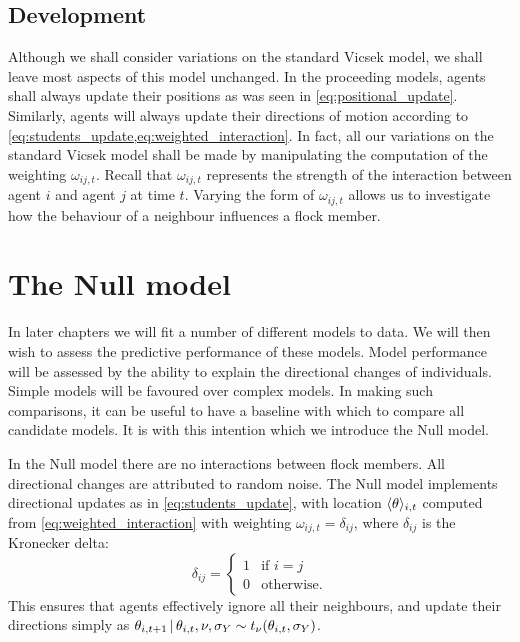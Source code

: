 \subsection{Development}

Although we shall consider variations on the standard Vicsek model, we shall
leave most aspects of this model unchanged. In the proceeding models, agents
shall always update their positions as was seen in \cref{eq:positional_update}.
Similarly, agents will always update their directions of motion according to
\cref{eq:students_update,eq:weighted_interaction}. In fact, all our variations
on the standard Vicsek model shall be made by manipulating the computation of
the weighting $\omega_{ij,t}$. Recall that $\omega_{ij,t}$ represents the
strength of the interaction between agent $i$ and agent $j$ at time $t$.
Varying the form of $\omega_{ij,t}$ allows us to investigate how the behaviour
of a neighbour influences a flock member.

\section{The Null model}
\label{sec:null_model}

In later chapters we will fit a number of different models to data. We will
then wish to assess the predictive performance of these models. Model
performance will be assessed by the ability to explain the directional changes
of individuals. Simple models will be favoured over complex models. In making
such comparisons, it can be useful to have a baseline with which to compare all
candidate models. It is with this intention which we introduce the Null model.

In the Null model there are no interactions between flock members. All
directional changes are attributed to random noise. The Null model implements
directional updates as in \cref{eq:students_update}, with location
$\langle\theta\rangle_{i,t}$ computed from \cref{eq:weighted_interaction} with
weighting $\omega_{ij,t}=\delta_{ij}$, where $\delta_{ij}$ is the Kronecker
delta:
\begin{equation*}
  \delta_{ij} =
  \begin{cases}
    1 & \text{if } i=j \\
    0 & \text{otherwise.}
  \end{cases}
\end{equation*}
This ensures that agents effectively ignore all their neighbours, and update
their directions simply as $\theta_{i,t+1} \,|\, \theta_{i,t}, \nu, \sigma_Y
\sim t_\nu(\theta_{i,t}, \sigma_Y)$.

